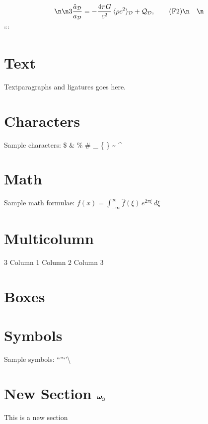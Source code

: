 \documentclass{article}
\newcommand{\omegas}{\boldsymbol{\omega}_{\mkern-2mu\scriptscriptstyle\boldsymbol{\circlearrowleft}}}  %
\begin{document}
\[\n\begin{aligned}\n3\frac{\ddot a_\mathcal{D}}{a_\mathcal{D}} &= -\frac{4\pi G}{c^2}\,\langle \rho c^2 \rangle_\mathcal{D} + \mathcal{Q}_\mathcal{D}, \tag{F2}\n\end{aligned}\n\]
```



    \section{Text}
    Text\quad paragraphs and ligatures goes here.

    \section{Characters}
    Sample characters:
    \$ \& \% \# \_ \{ \} \~{} \^{}


    \section{Math}
    Sample math formulae:
    $f(x) = \int_{-\infty}^\infty \hat f(\xi)\,e^{2 \pi \xi} \, d\xi$

    \section{Multicolumn}
    \begin{multicols}{3}
        Column 1
        Column 2
        Column 3
    \end{multicols}

    \section{Boxes}
    \medbreak\noindent{}\smallbreak

    \section{Symbols}
    Sample symbols:
    \noindent \textfractionsolidus \textdiv \texttimes \textminus \textpm \textsurd \textlnot \textasteriskcentered
    \textbullet \textperiodcentered \textdagger \textdaggerdbl \textsection \textparagraph \textbardbl \textellipsis
    \textquotedblleft \textquotedblright \textquoteleft \textquoteright \textbackslash \textbullet \textemdash \textendash


\section{New Section $\omegas\quad$} This is a new section
\end{document}
